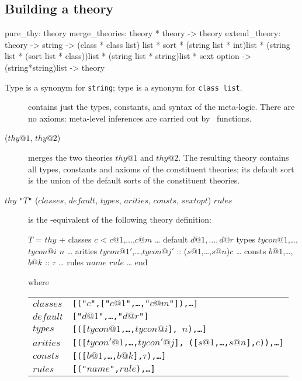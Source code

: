 \subsection{Building a theory}
\label{BuildingATheory}
\begin{ttbox} 
pure_thy: theory
merge_theories: theory * theory -> theory
extend_theory: theory -> string
        -> (class * class list) list 
           * sort
           * (string list * int)list
           * (string list * (sort list * class))list
           * (string list * string)list * sext option
        -> (string*string)list -> theory
\end{ttbox}
Type  is a synonym for {\tt string}; type  is
a synonym for \hbox{\tt class list}.
\begin{description}
\item[] contains just the types, constants, and syntax
  of the meta-logic.  There are no axioms: meta-level inferences are carried
  out by \ML\ functions.
\item[ ($thy@1$, $thy@2$)] merges the two
  theories $thy@1$ and $thy@2$.  The resulting theory contains all types,
  constants and axioms of the constituent theories; its default sort is the
  union of the default sorts of the constituent theories.
\item [ $thy$ {\tt"}$T${\tt"}
      ($classes$, $default$, $types$, $arities$, $consts$, $sextopt$) $rules$]
\hfill\break   %
is the \ML-equivalent of the following theory definition:
\begin{ttbox}
\(T\) = \(thy\) +
classes \(c\) < \(c@1\),\(\dots\),\(c@m\)
        \dots
default {\(d@1,\dots,d@r\)}
types   \(tycon@1\),\dots,\(tycon@i\) \(n\)
        \dots
arities \(tycon@1'\),\dots,\(tycon@j'\) :: (\(s@1\),\dots,\(s@n\))\(c\)
        \dots
consts  \(b@1\),\dots,\(b@k\) :: \(\tau\)
        \dots
rules   \(name\) \(rule\)
        \dots
end
\end{ttbox}
where
\begin{tabular}[t]{l@{~=~}l}
$classes$ & \tt[("$c$",["$c@1$",\dots,"$c@m$"]),\dots] \\
$default$ & \tt["$d@1$",\dots,"$d@r$"]\\
$types$   & \tt[([$tycon@1$,\dots,$tycon@i$], $n$),\dots] \\
$arities$ & \tt[([$tycon'@1$,\dots,$tycon'@j$], ([$s@1$,\dots,$s@n$],$c$)),\dots]
\\
$consts$  & \tt[([$b@1$,\dots,$b@k$],$\tau$),\dots] \\
$rules$   & \tt[("$name$",$rule$),\dots]
\end{tabular}


\end{description}
